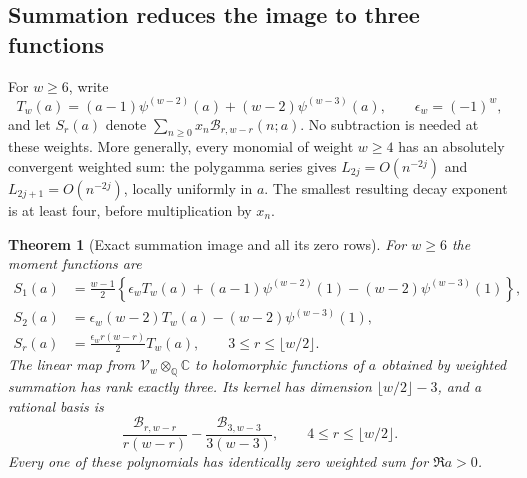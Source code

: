 \documentclass[11pt,a4paper]{article}
\numberwithin{equation}{section}
\newtheorem{theorem}{Theorem}[section]
\theoremstyle{definition}
\theoremstyle{remark}
\newcommand{\C}{\mathbb C}
\newcommand{\Q}{\mathbb Q}
\begin{document}
\subsection{Summation reduces the image to three functions}

For $w\ge6$, write
\begin{equation}
 T_w(a)=(a-1)\psi^{(w-2)}(a)+(w-2)\psi^{(w-3)}(a),
 \qquad \epsilon_w=(-1)^w,
 \label{bell:T}
\end{equation}
and let $S_r(a)$ denote
$\sum_{n\ge0}x_n\mathcal B_{r,w-r}(n;a)$.
No subtraction is needed at these weights. More generally, every
monomial of weight $w\ge4$ has an absolutely convergent weighted sum:
the polygamma series gives
$L_{2j}=O(n^{-2j})$ and $L_{2j+1}=O(n^{-2j})$, locally uniformly in
$a$. The smallest resulting decay exponent is at least four, before
multiplication by $x_n$.

\begin{theorem}[Exact summation image and all its zero rows]
\label{bell:image}
For $w\ge6$ the moment functions are
\begin{align}
 S_1(a)&=\frac{w-1}{2}\left\{
 \epsilon_wT_w(a)+(a-1)\psi^{(w-2)}(1)
                  -(w-2)\psi^{(w-3)}(1)\right\},\label{bell:S1}\\
 S_2(a)&=\epsilon_w(w-2)T_w(a)-(w-2)\psi^{(w-3)}(1),\label{bell:S2}\\
 S_r(a)&=\frac{\epsilon_wr(w-r)}2T_w(a),
 \qquad 3\le r\le\lfloor w/2\rfloor.\label{bell:Sr}
\end{align}
The linear map from $\mathcal V_w\otimes_{\Q}\C$ to holomorphic
functions of $a$ obtained by weighted summation has rank exactly three.
Its kernel has dimension $\lfloor w/2\rfloor-3$, and a rational basis is
\begin{equation}
 \frac{\mathcal B_{r,w-r}}{r(w-r)}
       -\frac{\mathcal B_{3,w-3}}{3(w-3)},
 \qquad 4\le r\le\lfloor w/2\rfloor.
 \label{bell:kernelbasis}
\end{equation}
Every one of these polynomials has identically zero weighted sum for
$\Re a>0$.
\end{theorem}
\end{document}
